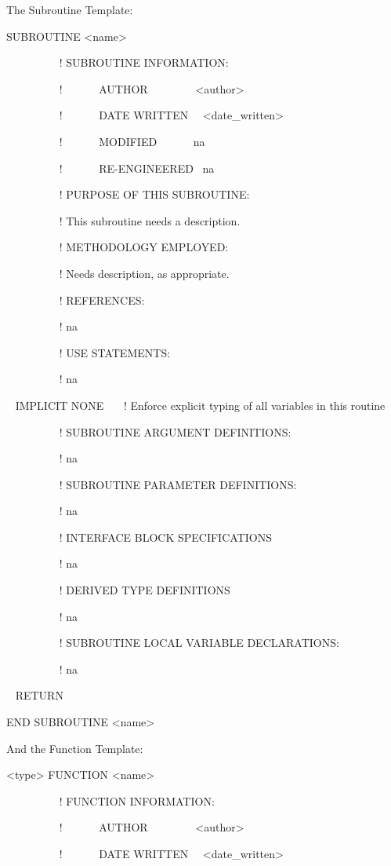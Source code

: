 The Subroutine Template:

SUBROUTINE \textless{}name\textgreater{}

~~~~~~~~~ ! SUBROUTINE INFORMATION:

~~~~~~~~~ !~~~~~~ AUTHOR~~~~~~~~ \textless{}author\textgreater{}

~~~~~~~~~ !~~~~~~ DATE WRITTEN~~ \textless{}date\_written\textgreater{}

~~~~~~~~~ !~~~~~~ MODIFIED~~~~~~ na

~~~~~~~~~ !~~~~~~ RE-ENGINEERED~ na

~~~~~~~~~ ! PURPOSE OF THIS SUBROUTINE:

~~~~~~~~~ ! This subroutine needs a description.

~~~~~~~~~ ! METHODOLOGY EMPLOYED:

~~~~~~~~~ ! Needs description, as appropriate.

~~~~~~~~~ ! REFERENCES:

~~~~~~~~~ ! na

~~~~~~~~~ ! USE STATEMENTS:

~~~~~~~~~ ! na

~ IMPLICIT NONE~~~ ! Enforce explicit typing of all variables in this routine

~~~~~~~~~ ! SUBROUTINE ARGUMENT DEFINITIONS:

~~~~~~~~~ ! na

~~~~~~~~~ ! SUBROUTINE PARAMETER DEFINITIONS:

~~~~~~~~~ ! na

~~~~~~~~~ ! INTERFACE BLOCK SPECIFICATIONS

~~~~~~~~~ ! na

~~~~~~~~~ ! DERIVED TYPE DEFINITIONS

~~~~~~~~~ ! na

~~~~~~~~~ ! SUBROUTINE LOCAL VARIABLE DECLARATIONS:

~~~~~~~~~ ! na

~ RETURN

END SUBROUTINE \textless{}name\textgreater{}

And the Function Template:

\textless{}type\textgreater{} FUNCTION \textless{}name\textgreater{}

~~~~~~~~~ ! FUNCTION INFORMATION:

~~~~~~~~~ !~~~~~~ AUTHOR~~~~~~~~ \textless{}author\textgreater{}

~~~~~~~~~ !~~~~~~ DATE WRITTEN~~ \textless{}date\_written\textgreater{}

